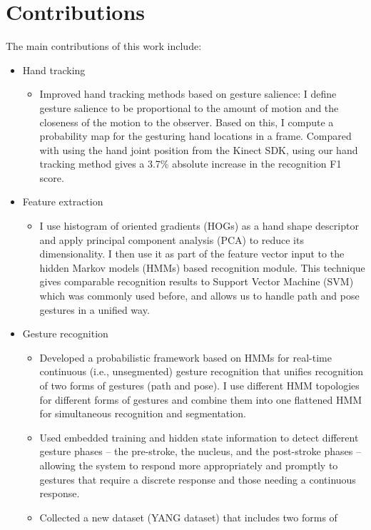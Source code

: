 \section{Contributions}
The main contributions of this work include:
\begin{itemize}
 \item Hand tracking
  \begin{itemize}
  \item Improved hand tracking methods based on gesture salience: I define
  gesture salience to be proportional to the amount of motion and the closeness
  of the motion to the observer. Based on this, I compute a probability map for the gesturing hand locations in a frame.  Compared with using the hand joint position from the Kinect SDK, using our hand tracking method gives a 3.7\% absolute increase in the recognition F1 score.
  \end{itemize}
 \item Feature extraction
  \begin{itemize}
  \item I use histogram of oriented gradients (HOGs) as a hand shape descriptor
  and apply principal component analysis (PCA) to reduce its dimensionality. I
  then use it as part of the feature vector input to the hidden Markov models (HMMs) based recognition module. This technique gives comparable recognition results to Support Vector Machine (SVM) which was commonly used before, and allows us to handle path and pose gestures in a unified way.
  \end{itemize}
  \item Gesture recognition
    \begin{itemize}
    \item Developed a probabilistic framework based on HMMs for real-time
    continuous (i.e., unsegmented) gesture recognition that unifies recognition
    of two forms of gestures (path and pose). I use different HMM topologies for
    different forms of gestures and combine them into one flattened HMM for
    simultaneous recognition and segmentation.
    \item Used embedded training and hidden state information to detect
    different gesture phases -- the pre-stroke, the nucleus, and the post-stroke
    phases -- allowing the system to respond more appropriately and promptly to
    gestures that require a discrete response and those needing a continuous response.
    \item Collected a new dataset (YANG dataset) that includes two forms of

\end{itemize}
\end{itemize}
